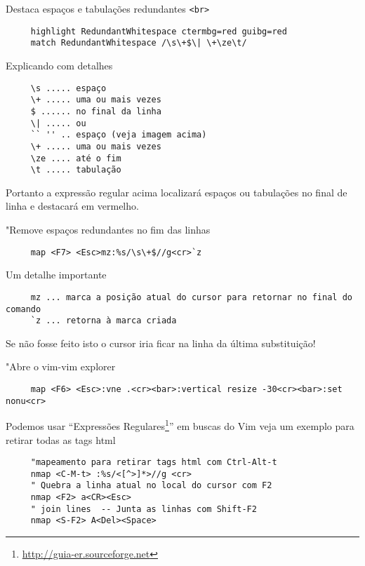 Destaca espaços e tabulações redundantes {\tt <br>}

\begin{verbatim}
     highlight RedundantWhitespace ctermbg=red guibg=red
     match RedundantWhitespace /\s\+$\| \+\ze\t/
\end{verbatim}

Explicando com detalhes

\begin{verbatim}
     \s ..... espaço
     \+ ..... uma ou mais vezes
     $ ...... no final da linha
     \| ..... ou
     `` '' .. espaço (veja imagem acima)
     \+ ..... uma ou mais vezes
     \ze .... até o fim
     \t ..... tabulação
\end{verbatim}

Portanto a expressão regular acima localizará espaços ou tabulações no final de linha
e destacará em vermelho.

"Remove espaços redundantes no fim das linhas

\begin{verbatim}
     map <F7> <Esc>mz:%s/\s\+$//g<cr>`z
\end{verbatim}

Um detalhe importante

\begin{verbatim}
     mz ... marca a posição atual do cursor para retornar no final do comando
     `z ... retorna à marca criada
\end{verbatim}

Se não fosse feito isto o cursor iria ficar na linha da última substituição!

"Abre o vim-vim explorer

\begin{verbatim}
     map <F6> <Esc>:vne .<cr><bar>:vertical resize -30<cr><bar>:set nonu<cr>
\end{verbatim}

Podemos usar ``Expressões Regulares\footnote{\url{http://guia-er.sourceforge.net}}'' em
buscas do Vim veja um exemplo para retirar todas as tags html

\begin{verbatim}
     "mapeamento para retirar tags html com Ctrl-Alt-t
     nmap <C-M-t> :%s/<[^>]*>//g <cr>
     " Quebra a linha atual no local do cursor com F2
     nmap <F2> a<CR><Esc>
     " join lines  -- Junta as linhas com Shift-F2
     nmap <S-F2> A<Del><Space>
\end{verbatim}

